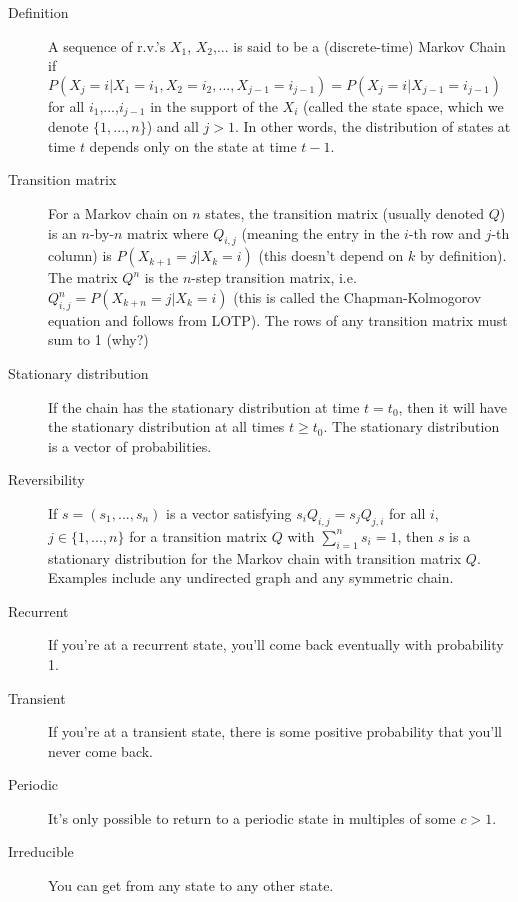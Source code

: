 \documentclass{article}
\begin{document}
\begin{description}

\item[Definition] A sequence of r.v.'s $X_1$, $X_2$,... is said to be a (discrete-time) Markov Chain if $P(X_j = i|X_1=i_1,X_2=i_2,...,X_{j-1}=i_{j-1}) = P(X_j=i|X_{j-1}=i_{j-1})$ for all $i_1$,...,$i_{j-1}$ in the support of the $X_i$ (called the state space, which we denote $\{1,...,n\}$) and all $j > 1$. In other words, the distribution of states at time $t$ depends only on the state at time $t-1$. 

\item[Transition matrix] For a Markov chain on $n$ states, the transition matrix (usually denoted $Q$) is an $n$-by-$n$ matrix where $Q_{i,j}$ (meaning the entry in the $i$-th row and $j$-th column) is $P(X_{k+1}=j|X_k=i)$ (this doesn't depend on $k$ by definition). The matrix $Q^n$ is the $n$-step transition matrix, i.e. $Q^n_{i,j} = P(X_{k+n}=j|X_k=i)$ (this is called the Chapman-Kolmogorov equation and follows from LOTP). The rows of any transition matrix must sum to 1 (why?)

\item[Stationary distribution] If the chain has the stationary distribution at time $t = t_0$, then it will have the stationary distribution at all times $t \geq t_0$. The stationary distribution is a vector of probabilities.

\item[Reversibility] If $s = (s_1,...,s_n)$ is a vector satisfying $s_iQ_{i,j} = s_jQ_{j,i}$ for all $i$, $j \in \{1,...,n\}$ for a transition matrix $Q$ with $\sum_{i=1}^n s_i = 1$, then $s$ is a stationary distribution for the Markov chain with transition matrix $Q$. Examples include any undirected graph and any symmetric chain. 

\item[Recurrent] If you're at a recurrent state, you'll come back eventually with probability 1.

\item[Transient] If you're at a transient state, there is some positive probability that you'll never come back.

\item[Periodic] It's only possible to return to a periodic state in multiples of some $c > 1$.

\item[Irreducible] You can get from any state to any other state.

\end{description}
\end{document}
